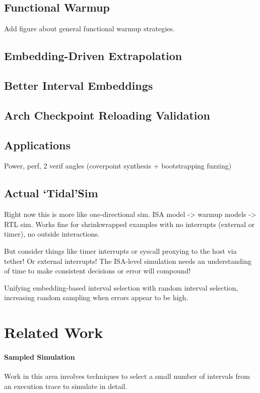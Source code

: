 \documentclass[sigplan,nonacm,10pt]{acmart}
\begin{document}
\subsection{Functional Warmup}

Add figure about general functional warmup strategies.

\subsection{Embedding-Driven Extrapolation}

\subsection{Better Interval Embeddings}

\subsection{Arch Checkpoint Reloading Validation}

\subsection{Applications}

Power, perf, 2 verif angles (coverpoint synthesis + bootstrapping fuzzing)

\subsection{Actual `Tidal'Sim}

Right now this is more like one-directional sim. ISA model -> warmup models -> RTL sim.
Works fine for shrinkwrapped examples with no interrupts (external or timer), no outside interactions.

But consider things like timer interrupts or syscall proxying to the host via tether! Or external interrupts!
The ISA-level simulation needs an understanding of time to make consistent decisions or error will compound!

Unifying embedding-based interval selection with random interval selection, increasing random sampling when errors appear to be high.

\section{Related Work}

\paragraph{Sampled Simulation} Work in this area involves techniques to select a small number of intervals from an execution trace to simulate in detail.
\end{document}
